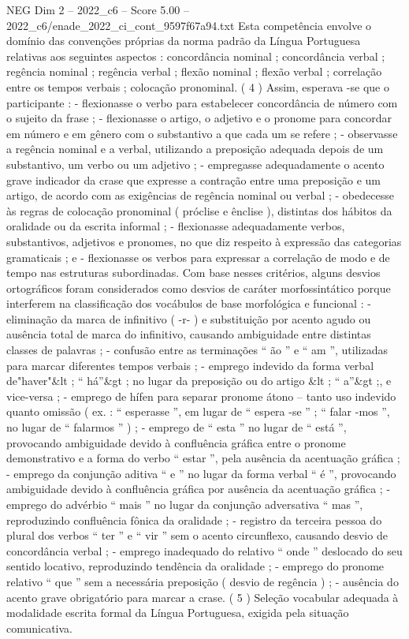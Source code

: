 \begin{textsample}{NEG Dim 2 – 2022\_c6 – Score 5.00 – 2022\_c6/enade\_2022\_ci\_cont\_9597f67a94.txt}
Esta competência envolve o domínio das convenções próprias da norma padrão da Língua Portuguesa relativas aos seguintes aspectos : concordância nominal ; concordância verbal ; regência nominal ; regência verbal ; flexão nominal ; flexão verbal ; correlação entre os tempos verbais ; colocação pronominal. ( 4 ) Assim, esperava -se que o participante : - flexionasse o verbo para estabelecer concordância de número com o sujeito da frase ; - flexionasse o artigo, o adjetivo e o pronome para concordar em número e em gênero com o substantivo a que cada um se refere ; - observasse a regência nominal e a verbal, utilizando a preposição adequada depois de um substantivo, um verbo ou um adjetivo ; - empregasse adequadamente o acento grave indicador da crase que expresse a contração entre uma preposição e um artigo, de acordo com as exigências de regência nominal ou verbal ; - obedecesse às regras de colocação pronominal ( próclise e ênclise ), distintas dos hábitos da oralidade ou da escrita informal ; - flexionasse adequadamente verbos, substantivos, adjetivos e pronomes, no que diz respeito à expressão das categorias gramaticais ; e - flexionasse os verbos para expressar a correlação de modo e de tempo nas estruturas subordinadas.
Com base nesses critérios, alguns desvios ortográficos foram considerados como desvios de caráter morfossintático porque interferem na classificação dos vocábulos de base morfológica e funcional : - eliminação da marca de infinitivo ( -r- ) e substituição por acento agudo ou ausência total de marca do infinitivo, causando ambiguidade entre distintas classes de palavras ; - confusão entre as terminações “ ão ” e “ am ”, utilizadas para marcar diferentes tempos verbais ; - emprego indevido da forma verbal de"haver"\&lt ; “ há”\&gt ; no lugar da preposição ou do artigo \&lt ; “ a”\&gt ;, e vice-versa ; - emprego de hífen para separar pronome átono – tanto uso indevido quanto omissão ( ex. : “ esperasse ”, em lugar de “ espera -se ” ; “ falar -mos ”, no lugar de “ falarmos ” ) ; - emprego de “ esta ” no lugar de “ está ”, provocando ambiguidade devido à confluência gráfica entre o pronome demonstrativo e a forma do verbo “ estar ”, pela ausência da acentuação gráfica ; - emprego da conjunção aditiva “ e ” no lugar da forma verbal “ é ”, provocando ambiguidade devido à confluência gráfica por ausência da acentuação gráfica ; - emprego do advérbio “ mais ” no lugar da conjunção adversativa “ mas ”, reproduzindo confluência fônica da oralidade ; - registro da terceira pessoa do plural dos verbos “ ter ” e “ vir ” sem o acento circunflexo, causando desvio de concordância verbal ; - emprego inadequado do relativo “ onde ” deslocado do seu sentido locativo, reproduzindo tendência da oralidade ; - emprego do pronome relativo “ que ” sem a necessária preposição ( desvio de regência ) ; - ausência do acento grave obrigatório para marcar a crase. ( 5 ) Seleção vocabular adequada à modalidade escrita formal da Língua Portuguesa, exigida pela situação comunicativa.

\end{textsample}
